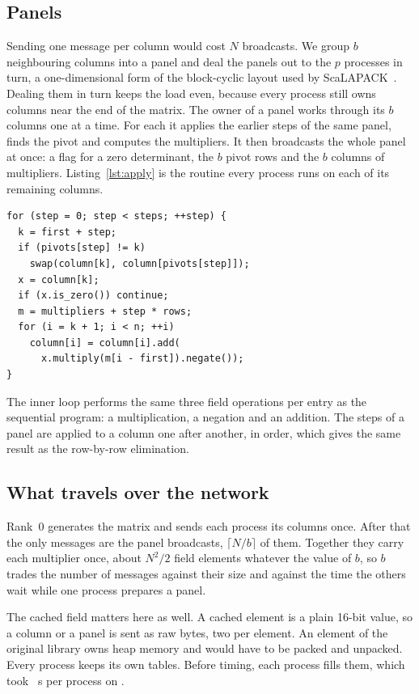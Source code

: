 \subsection{Panels}

Sending one message per column would cost $N$ broadcasts. We group $b$ neighbouring columns
into a panel and deal the panels out to the $p$ processes in turn, a one-dimensional form
of the block-cyclic layout used by ScaLAPACK~\cite{blackford1997scalapack}. Dealing them in turn keeps the load even,
because every process still owns columns near the end of the matrix. The owner of a panel
works through its $b$ columns one at a time. For each it applies the earlier steps of the
same panel, finds the pivot and computes the multipliers. It then broadcasts the whole
panel at once: a flag for a zero determinant, the $b$ pivot rows and the $b$ columns of
multipliers. Listing~\ref{lst:apply} is the routine every process runs on each of its
remaining columns.

\begin{lstlisting}[float=t,caption={Applying one panel to one column. \code{first} is the
panel's first column.},label={lst:apply}]
for (step = 0; step < steps; ++step) {
  k = first + step;
  if (pivots[step] != k)
    swap(column[k], column[pivots[step]]);
  x = column[k];
  if (x.is_zero()) continue;
  m = multipliers + step * rows;
  for (i = k + 1; i < n; ++i)
    column[i] = column[i].add(
      x.multiply(m[i - first]).negate());
}
\end{lstlisting}

The inner loop performs the same three field operations per entry as the sequential
program: a multiplication, a negation and an addition. The steps of a panel are applied to
a column one after another, in order, which gives the same result as the row-by-row
elimination.

\subsection{What travels over the network}

Rank~0 generates the matrix and sends each process its columns once. After that the only
messages are the panel broadcasts, $\lceil N/b \rceil$ of them. Together they carry each
multiplier once, about $N^2/2$ field elements whatever the value of $b$, so $b$ trades the
number of messages against their size and against the time the others wait while
one process prepares a panel.

The cached field matters here as well. A cached element is a plain 16-bit value, so a
column or a panel is sent as raw bytes, two per element. An element of the original library
owns heap memory and would have to be packed and unpacked. Every process keeps its own
tables. Before timing, each process fills them, which took \CacheWarmSeconds~s per process
on \MpiMachine.

